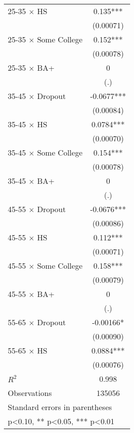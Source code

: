 \begin{table}[htbp]
\begin{tabular}{l*{1}{c}}
25-35 $\times$ HS   &       0.135***\\
                    &   (0.00071)   \\
25-35 $\times$ Some College&       0.152***\\
                    &   (0.00078)   \\
25-35 $\times$ BA+  &           0   \\
                    &         (.)   \\
35-45 $\times$ Dropout&     -0.0677***\\
                    &   (0.00084)   \\
35-45 $\times$ HS   &      0.0784***\\
                    &   (0.00070)   \\
35-45 $\times$ Some College&       0.154***\\
                    &   (0.00078)   \\
35-45 $\times$ BA+  &           0   \\
                    &         (.)   \\
45-55 $\times$ Dropout&     -0.0676***\\
                    &   (0.00086)   \\
45-55 $\times$ HS   &       0.112***\\
                    &   (0.00071)   \\
45-55 $\times$ Some College&       0.158***\\
                    &   (0.00079)   \\
45-55 $\times$ BA+  &           0   \\
                    &         (.)   \\
55-65 $\times$ Dropout&    -0.00166*  \\
                    &   (0.00090)   \\
55-65 $\times$ HS   &      0.0884***\\
                    &   (0.00076)   \\
\midrule
\(R^{2}\)           &       0.998   \\
Observations        &      135056   \\
\bottomrule
\multicolumn{2}{l}{\footnotesize Standard errors in parentheses}\\
\multicolumn{2}{l}{\footnotesize * p<0.10, ** p<0.05, *** p<0.01}\\
\end{tabular}
\end{table}



